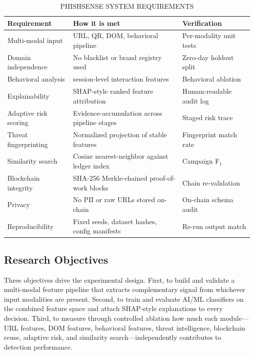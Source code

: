 \documentclass[conference]{IEEEtran}
\begin{document}
\begin{table}[!t]
\caption{PHISHSENSE SYSTEM REQUIREMENTS}
\label{tab:req}
\centering
\scriptsize
\setlength{\tabcolsep}{3pt}
\begin{tabularx}{\columnwidth}{|>{\raggedright\arraybackslash}p{}|>{\raggedright\arraybackslash}X|>{\raggedright\arraybackslash}p{}|}
\hline
\textbf{Requirement} & \textbf{How it is met} & \textbf{Verification} \\ \hline
Multi-modal input      & URL, QR, DOM, behavioral pipeline   & Per-modality unit tests   \\ \hline
Domain independence    & No blacklist or brand registry used & Zero-day holdout split    \\ \hline
Behavioral analysis    & 13 session-level interaction features & Behavioral ablation       \\ \hline
Explainability         & SHAP-style ranked feature attribution & Human-readable audit log  \\ \hline
Adaptive risk scoring  & Evidence-accumulation across pipeline stages & Staged risk trace   \\ \hline
Threat fingerprinting  & Normalized projection of stable features & Fingerprint match rate \\ \hline
Similarity search      & Cosine nearest-neighbor against ledger index & Campaign F$_1$      \\ \hline
Blockchain integrity   & SHA-256 Merkle-chained proof-of-work blocks & Chain re-validation  \\ \hline
Privacy                & No PII or raw URLs stored on-chain  & On-chain schema audit     \\ \hline
Reproducibility        & Fixed seeds, dataset hashes, config manifests & Re-run output match \\ \hline
\end{tabularx}
\end{table}

\subsection{Research Objectives}
Three objectives drive the experimental design.
First, to build and validate a multi-modal feature pipeline that extracts complementary signal
from whichever input modalities are present.
Second, to train and evaluate AI/ML classifiers on the combined feature space and attach
SHAP-style explanations to every decision.
Third, to measure through controlled ablation how much each module---URL features, DOM features,
behavioral features, threat intelligence, blockchain reuse, adaptive risk, and similarity
search---independently contributes to detection performance.
\end{document}
